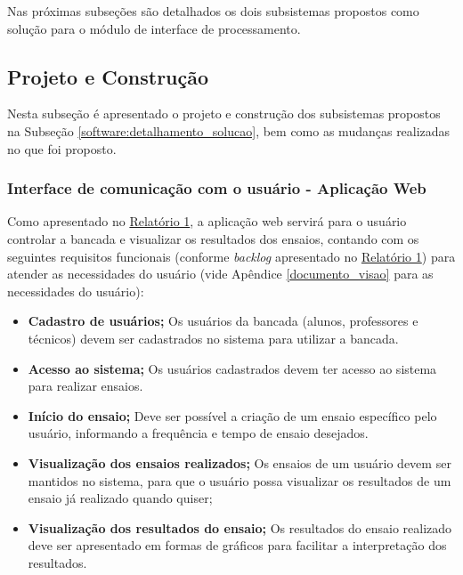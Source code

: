Nas próximas subseções são detalhados os dois subsistemas propostos como solução para o módulo de interface de processamento.


\subsection{Projeto e Construção}

  Nesta subseção é apresentado o projeto e construção dos subsistemas propostos na Subseção \ref{software:detalhamento_solucao},
  bem como as mudanças realizadas no que foi proposto.

\subsubsection{\textbf{Interface de comunicação com o usuário - Aplicação Web}} \label{software:app_web}
    
    Como  apresentado no \href{https://drive.google.com/file/d/0B5InkGKx6O-MR1B3eVYzZFpjQ3c/view?usp=sharing}{Relatório 1},
    a aplicação web servirá para o usuário controlar a bancada e visualizar os resultados dos ensaios, contando com os seguintes requisitos
    funcionais (conforme \textit{backlog} apresentado no \href{https://drive.google.com/file/d/0B5InkGKx6O-MR1B3eVYzZFpjQ3c/view?usp=sharing}{Relatório 1})
    para atender as necessidades do usuário (vide Apêndice \ref{documento_visao} para as necessidades do usuário):
    
    \begin{itemize}
      \item \textbf{Cadastro de usuários;}
	 \subitem Os usuários da bancada (alunos, professores e técnicos) devem ser cadastrados no sistema para utilizar a bancada.
      \item \textbf{Acesso ao sistema;}
	 \subitem Os usuários cadastrados devem ter acesso ao sistema para realizar ensaios.
      \item \textbf{Início do ensaio;}
	 \subitem Deve ser possível a criação de um ensaio específico pelo usuário, informando a frequência e tempo de ensaio desejados.
      \item \textbf{Visualização dos ensaios realizados;}
	 \subitem Os ensaios de um usuário devem ser mantidos no sistema, para que o usuário possa visualizar os resultados de um ensaio
		  já realizado quando quiser;
      \item \textbf{Visualização dos resultados do ensaio;}
	 \subitem Os resultados do ensaio realizado deve ser apresentado em formas de gráficos para facilitar a interpretação dos resultados.
    \end{itemize}
     

